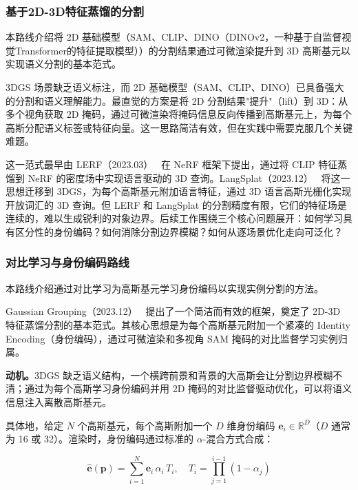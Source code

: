 \subsubsection{基于2D-3D特征蒸馏的分割}

本路线介绍将 2D 基础模型（SAM、CLIP、DINO（DINOv2，一种基于自监督视觉Transformer的特征提取模型））的分割结果通过可微渲染提升到 3D 高斯基元以实现语义分割的基本范式。

3DGS 场景缺乏语义标注，而 2D 基础模型（SAM、CLIP、DINO）已具备强大的分割和语义理解能力。最直觉的方案是将 2D 分割结果"提升"（lift）到 3D：从多个视角获取 2D 掩码，通过可微渲染将掩码信息反向传播到高斯基元上，为每个高斯分配语义标签或特征向量。这一思路简洁有效，但在实践中需要克服几个关键难题。

这一范式最早由 LERF（2023.03）~\cite{2303_09553} 在 NeRF 框架下提出，通过将 CLIP 特征蒸馏到 NeRF 的密度场中实现语言驱动的 3D 查询。LangSplat（2023.12）~\cite{2312_16081} 将这一思想迁移到 3DGS，为每个高斯基元附加语言特征，通过 3D 语言高斯光栅化实现开放词汇的 3D 查询。但 LERF 和 LangSplat 的分割精度有限，它们的特征场是连续的，难以生成锐利的对象边界。后续工作围绕三个核心问题展开：如何学习具有区分性的身份编码？如何消除分割边界模糊？如何从逐场景优化走向可泛化？

\subsubsection{对比学习与身份编码路线}

本路线介绍通过对比学习为高斯基元学习身份编码以实现实例分割的方法。

Gaussian Grouping（2023.12）~\cite{2312_00732} 提出了一个简洁而有效的框架，奠定了 2D-3D 特征蒸馏分割的基本范式。其核心思想是为每个高斯基元附加一个紧凑的 Identity Encoding（身份编码），通过可微渲染和多视角 SAM 掩码的对比监督学习实例归属。

\textbf{动机。}3DGS 缺乏语义结构，一个横跨前景和背景的大高斯会让分割边界模糊不清；通过为每个高斯学习身份编码并用 2D 掩码的对比监督驱动优化，可以将语义信息注入离散高斯基元。

具体地，给定 $N$ 个高斯基元，每个高斯附加一个 $D$ 维身份编码 $\mathbf{e}_i \in \mathbb{R}^D$（$D$ 通常为 16 或 32）。渲染时，身份编码通过标准的 $\alpha$-混合方式合成：

\begin{equation}
\label{eq:10_identity_render}
\hat{\mathbf{e}}(\mathbf{p}) = \sum_{i=1}^{N} \mathbf{e}_i \, \alpha_i \, T_i, \quad T_i = \prod_{j=1}^{i-1}(1 - \alpha_j)
\end{equation}

